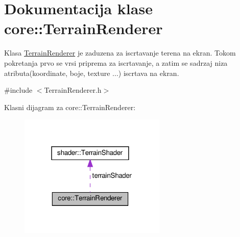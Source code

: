 \hypertarget{classcore_1_1TerrainRenderer}{}\section{Dokumentacija klase core\+:\+:Terrain\+Renderer}
\label{classcore_1_1TerrainRenderer}


Klasa \hyperlink{classcore_1_1TerrainRenderer}{Terrain\+Renderer} je zaduzena za iscrtavanje terena na ekran. Tokom pokretanja prvo se vrsi priprema za iscrtavanje, a zatim se sadrzaj niza atributa(koordinate, boje, texture ...) iscrtava na ekran.  




{\ttfamily \#include $<$Terrain\+Renderer.\+h$>$}



Klasni dijagram za core\+:\+:Terrain\+Renderer\+:\nopagebreak
\begin{figure}[H]
\begin{center}
\leavevmode
\includegraphics[width=198pt]{classcore_1_1TerrainRenderer__coll__graph}
\end{center}
\end{figure}
